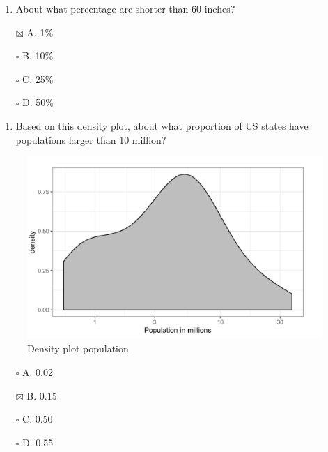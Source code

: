 \documentclass[
]{article}
\providecommand{\tightlist}{%
  \setlength{\itemsep}{0pt}\setlength{\parskip}{0pt}}
\begin{document}
\begin{enumerate}
\def\labelenumi{\arabic{enumi}.}
\setcounter{enumi}{7}
\tightlist
\item
  About what percentage are shorter than 60 inches?
\end{enumerate}

\begin{itemize}
\tightlist
\item[$\boxtimes$]
  A. 1\%
\item[$\square$]
  B. 10\%
\item[$\square$]
  C. 25\%
\item[$\square$]
  D. 50\%
\end{itemize}

\newpage

\begin{enumerate}
\def\labelenumi{\arabic{enumi}.}
\setcounter{enumi}{8}
\tightlist
\item
  Based on this density plot, about what proportion of US states have
  populations larger than 10 million?
\end{enumerate}

\begin{figure}
\centering
\includegraphics{images/Density plot population.png}
\caption{Density plot population}
\end{figure}

\begin{itemize}
\tightlist
\item[$\square$]
  A. 0.02
\item[$\boxtimes$]
  B. 0.15
\item[$\square$]
  C. 0.50
\item[$\square$]
  D. 0.55
\end{itemize}
\end{document}
